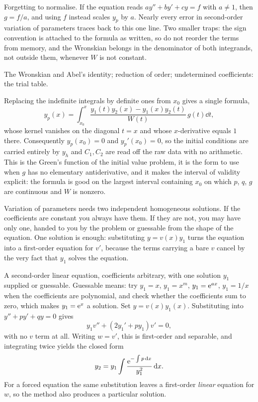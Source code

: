 \begin{trap}
Forgetting to normalise. If the equation reads $ay''+by'+cy=f$ with $a\ne1$, then $g=f/a$, and using $f$ instead scales $y_p$ by $a$. Nearly every error in second-order variation of parameters traces back to this one line. Two smaller traps: the sign convention is attached to the formula as written, so do not reorder the terms from memory, and the Wronskian belongs in the denominator of both integrands, not outside them, whenever $W$ is not constant.
\end{trap}

\begin{seealsob}The Wronskian and Abel's identity; reduction of order; undetermined coefficients: the trial table.\end{seealsob}

\begin{keynote}
Replacing the indefinite integrals by definite ones from $x_0$ gives a single formula,
\[y_p(x)=\int_{x_0}^{x}\frac{y_1(t)y_2(x)-y_1(x)y_2(t)}{W(t)}\,g(t)\dd t,\]
whose kernel vanishes on the diagonal $t=x$ and whose $x$-derivative equals $1$ there. Consequently $y_p(x_0)=0$ and $y_p'(x_0)=0$, so the initial conditions are carried entirely by $y_h$ and $C_1,C_2$ are read off the raw data with no arithmetic. This is the Green's function of the initial value problem, it is the form to use when $g$ has no elementary antiderivative, and it makes the interval of validity explicit: the formula is good on the largest interval containing $x_0$ on which $p$, $q$, $g$ are continuous and $W$ is nonzero.
\end{keynote}

Variation of parameters needs two independent homogeneous solutions. If the coefficients are constant you always have them. If they are not, you may have only one, handed to you by the problem or guessable from the shape of the equation. One solution is enough: substituting $y=v(x)y_1$ turns the equation into a first-order equation for $v'$, because the terms carrying a bare $v$ cancel by the very fact that $y_1$ solves the equation.

\cue A second-order linear equation, coefficients arbitrary, with one solution $y_1$ supplied or guessable. Guessable means: try $y_1=x$, $y_1=x^{m}$, $y_1=\mathrm{e}^{ax}$, $y_1=1/x$ when the coefficients are polynomial, and check whether the coefficients sum to zero, which makes $y_1=\mathrm{e}^{x}$ a solution.
\method Set $y=v(x)y_1(x)$. Substituting into $y''+py'+qy=0$ gives
\[y_1v''+(2y_1'+py_1)v'=0,\]
with no $v$ term at all. Writing $w=v'$, this is first-order and separable, and integrating twice yields the closed form
\[y_2=y_1\int\frac{\mathrm{e}^{-\int p\,\mathrm{d} x}}{y_1^{2}}\,\mathrm{d} x.\]
For a forced equation the same substitution leaves a first-order \emph{linear} equation for $w$, so the method also produces a particular solution.

